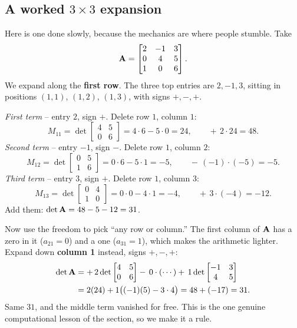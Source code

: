 \subsection{A worked \texorpdfstring{$3\times3$}{3x3} expansion}

Here is one done slowly, because the mechanics are where people stumble. Take
\[
\mathbf{A}=\begin{bmatrix} 2 & -1 & 3 \\ 0 & 4 & 5 \\ 1 & 0 & 6 \end{bmatrix}.
\]
We expand along the \textbf{first row}. The three top entries are $2,-1,3$, sitting in positions
$(1,1)$, $(1,2)$, $(1,3)$, with signs $+,-,+$.

\emph{First term} -- entry $2$, sign $+$. Delete row $1$, column $1$:
\[
M_{11}=\det\begin{bmatrix} 4 & 5 \\ 0 & 6 \end{bmatrix}=4\cdot6-5\cdot0=24,
\qquad +\,2\cdot 24 = 48.
\]
\emph{Second term} -- entry $-1$, sign $-$. Delete row $1$, column $2$:
\[
M_{12}=\det\begin{bmatrix} 0 & 5 \\ 1 & 6 \end{bmatrix}=0\cdot6-5\cdot1=-5,
\qquad -\,(-1)\cdot(-5) = -5.
\]
\emph{Third term} -- entry $3$, sign $+$. Delete row $1$, column $3$:
\[
M_{13}=\det\begin{bmatrix} 0 & 4 \\ 1 & 0 \end{bmatrix}=0\cdot0-4\cdot1=-4,
\qquad +\,3\cdot(-4) = -12.
\]
Add them: $\det\mathbf{A} = 48-5-12 = 31$.

Now use the freedom to pick ``any row or column.'' The first column of $\mathbf{A}$ has a zero in it
($a_{21}=0$) and a one ($a_{31}=1$), which makes the arithmetic lighter. Expand down
\textbf{column 1} instead, signs $+,-,+$:
\[
\begin{aligned}
\det\mathbf{A}
&= +\,2\det\begin{bmatrix}4&5\\0&6\end{bmatrix}
 -\,0\cdot(\cdots)
 +\,1\det\begin{bmatrix}-1&3\\4&5\end{bmatrix}\\
&= 2(24) + 1\big((-1)(5)-3\cdot4\big)
= 48 + (-17) = 31.
\end{aligned}
\]
Same $31$, and the middle term vanished for free. This is the one genuine computational lesson of the
section, so we make it a rule.

